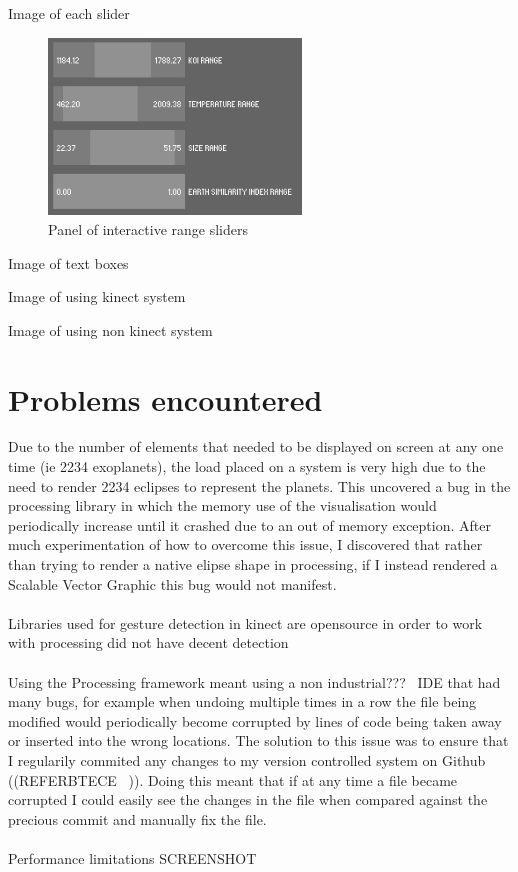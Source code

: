 Image of each slider
\begin{figure}[h!]
  \centering
      \includegraphics[width=0.6\textwidth]{images/sliders.jpg}
  \caption{Panel of interactive range sliders}
  \label{fig:sliders}
\end{figure}
Image of text boxes

Image of using kinect system

Image of using non kinect system

\section{Problems encountered}
Due to the number of elements that needed to be displayed on screen at any one time (ie 2234 exoplanets), the load placed on a system is very high due to the need to render 2234 eclipses to represent the planets. This uncovered a bug in the processing library in which the memory use of the visualisation would periodically increase until it crashed due to an out of memory exception. After much experimentation of how to overcome this issue, I discovered that rather than trying to render a native elipse shape in processing, if I instead rendered a Scalable Vector Graphic this bug would not manifest. 
\\\\
Libraries used for gesture detection in kinect are opensource in order to work with processing did not have decent detection
\\\\
Using the Processing framework meant using a non industrial???~ IDE that had many bugs, for example when undoing multiple times in a row the file being modified would periodically become corrupted by lines of code being taken away or inserted into the wrong locations. The solution to this issue was to ensure that I regularily commited any changes to my version controlled system on Github ((REFERBTECE ~)). Doing this meant that if at any time a file became corrupted I could easily see the changes in the file when compared against the precious commit and manually fix the file. 
\\\\
Performance limitations
SCREENSHOT ~